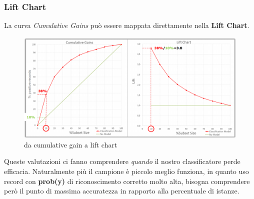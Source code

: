 \subsubsection{Lift Chart}
La curva \textit{Cumulative Gains} può essere mappata direttamente nella \textbf{Lift Chart}.

\begin{figure}[H]
	\centering
	\includegraphics[height=0.45 \linewidth]{classification/pict/lift_chart.png}
	\caption{da cumulative gain a lift chart}
\end{figure}

Queste valutazioni ci fanno comprendere \textit{quando} il nostro classificatore perde efficacia. Naturalmente pi\`u il campione \`e piccolo meglio funziona, in quanto uso record con \textbf{prob(y)} di riconoscimento corretto molto alta, bisogna comprendere per\`o il punto di massima accuratezza in rapporto alla percentuale di istanze.

